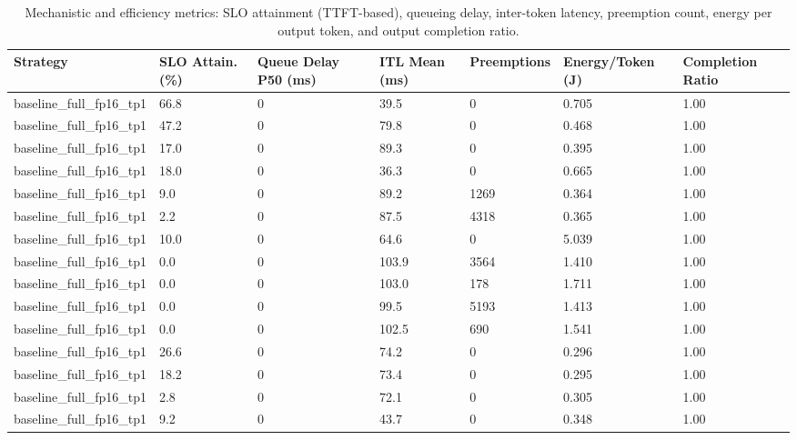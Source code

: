 \begin{table}
\caption{Mechanistic and efficiency metrics: SLO attainment (TTFT-based), queueing delay, inter-token latency, preemption count, energy per output token, and output completion ratio.}
\label{tab:efficiency}
\begin{tabular}{lllllll}
\toprule
Strategy & SLO Attain. (\%) & Queue Delay P50 (ms) & ITL Mean (ms) & Preemptions & Energy/Token (J) & Completion Ratio \\
\midrule
baseline\_full\_fp16\_tp1 & 66.8 & 0 & 39.5 & 0 & 0.705 & 1.00 \\
baseline\_full\_fp16\_tp1 & 47.2 & 0 & 79.8 & 0 & 0.468 & 1.00 \\
baseline\_full\_fp16\_tp1 & 17.0 & 0 & 89.3 & 0 & 0.395 & 1.00 \\
baseline\_full\_fp16\_tp1 & 18.0 & 0 & 36.3 & 0 & 0.665 & 1.00 \\
baseline\_full\_fp16\_tp1 & 9.0 & 0 & 89.2 & 1269 & 0.364 & 1.00 \\
baseline\_full\_fp16\_tp1 & 2.2 & 0 & 87.5 & 4318 & 0.365 & 1.00 \\
baseline\_full\_fp16\_tp1 & 10.0 & 0 & 64.6 & 0 & 5.039 & 1.00 \\
baseline\_full\_fp16\_tp1 & 0.0 & 0 & 103.9 & 3564 & 1.410 & 1.00 \\
baseline\_full\_fp16\_tp1 & 0.0 & 0 & 103.0 & 178 & 1.711 & 1.00 \\
baseline\_full\_fp16\_tp1 & 0.0 & 0 & 99.5 & 5193 & 1.413 & 1.00 \\
baseline\_full\_fp16\_tp1 & 0.0 & 0 & 102.5 & 690 & 1.541 & 1.00 \\
baseline\_full\_fp16\_tp1 & 26.6 & 0 & 74.2 & 0 & 0.296 & 1.00 \\
baseline\_full\_fp16\_tp1 & 18.2 & 0 & 73.4 & 0 & 0.295 & 1.00 \\
baseline\_full\_fp16\_tp1 & 2.8 & 0 & 72.1 & 0 & 0.305 & 1.00 \\
baseline\_full\_fp16\_tp1 & 9.2 & 0 & 43.7 & 0 & 0.348 & 1.00 \\
\bottomrule
\end{tabular}
\end{table}
